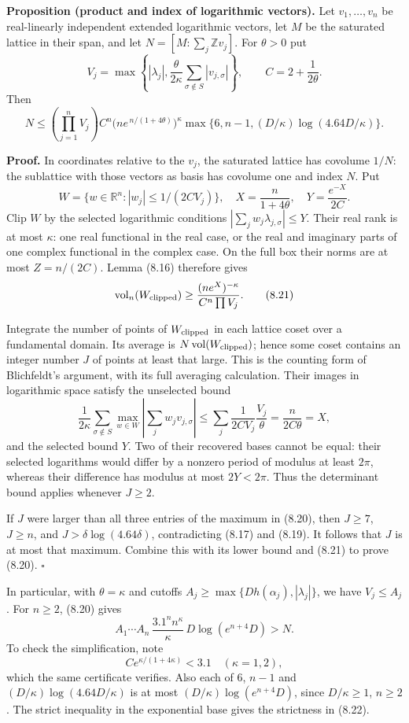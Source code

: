 \documentclass[
  11pt,
  a4paper,
]{article}
\begin{document}
\textbf{Proposition (product and index of logarithmic vectors).} Let
\(v_1,\ldots,v_n\) be real-linearly independent extended logarithmic
vectors, let \(M\) be the saturated lattice in their span, and let
\(N=[M:\sum_j\mathbb Z v_j]\). For \(\theta>0\) put \[
V_j=\max\left\{|\lambda_j|,
\frac{\theta}{2\kappa}\sum_{\sigma\notin S}|v_{j,\sigma}|\right\},\qquad
C=2+\frac1{2\theta}.
\] Then \[
N\le
\left(\prod_{j=1}^nV_j\right)
C^n\bigl(n e^{\,n/(1+4\theta)}\bigr)^\kappa
\max\{6,n-1,(D/\kappa)\log(4.64D/\kappa)\}.
\tag{8.20}
\]

\textbf{Proof.} In coordinates relative to the \(v_j\), the saturated
lattice has covolume \(1/N\): the sublattice with those vectors as basis
has covolume one and index \(N\). Put \[
W=\{w\in\mathbb R^n:|w_j|\le1/(2CV_j)\},\quad
X=\frac{n}{1+4\theta},\quad Y=\frac{e^{-X}}{2C}.
\] Clip \(W\) by the selected logarithmic conditions
\(|\sum_jw_j\lambda_{j,\sigma}|\le Y\). Their real rank is at most
\(\kappa\): one real functional in the real case, or the real and
imaginary parts of one complex functional in the complex case. On the
full box their norms are at most \(Z=n/(2C)\). Lemma (8.16) therefore
gives \[
\operatorname{vol}_n(W_{\rm clipped})
\ge\frac{(n e^X)^{-\kappa}}{C^n\prod V_j}.
\tag{8.21}
\]

Integrate the number of points of \(W_{\rm clipped}\) in each lattice
coset over a fundamental domain. Its average is
\(N\operatorname{vol}(W_{\rm clipped})\); hence some coset contains an
integer number \(J\) of points at least that large. This is the counting
form of Blichfeldt's argument, with its full averaging calculation.
Their images in logarithmic space satisfy the unselected bound \[
\frac1{2\kappa}\sum_{\sigma\notin S}
\max_{w\in W}\left|\sum_jw_jv_{j,\sigma}\right|
\le\sum_j\frac1{2CV_j}\frac{V_j}{\theta}
=\frac n{2C\theta}=X,
\] and the selected bound \(Y\). Two of their recovered bases cannot be
equal: their selected logarithms would differ by a nonzero period of
modulus at least \(2\pi\), whereas their difference has modulus at most
\(2Y<2\pi\). Thus the determinant bound applies whenever \(J\ge2\).

If \(J\) were larger than all three entries of the maximum in (8.20),
then \(J\ge7\), \(J\ge n\), and \(J>\delta\log(4.64\delta)\),
contradicting (8.17) and (8.19). It follows that \(J\) is at most that
maximum. Combine this with its lower bound and (8.21) to prove (8.20).
\(\square\)

In particular, with \(\theta=\kappa\) and cutoffs
\(A_j\ge\max\{D h(\alpha_j),|\lambda_j|\}\), we have \(V_j\le A_j\). For
\(n\ge2\), (8.20) gives \[
A_1\cdots A_n\,\frac{3.1^n n^\kappa}{\kappa}\,
D\log(e^{n+4}D)>N.
\tag{8.22}
\] To check the simplification, note \[
C e^{\kappa/(1+4\kappa)}<3.1
\quad(\kappa=1,2),
\] which the same certificate verifies. Also each of \(6\), \(n-1\) and
\((D/\kappa)\log(4.64D/\kappa)\) is at most
\((D/\kappa)\log(e^{n+4}D)\), since \(D/\kappa\ge1\), \(n\ge2\). The
strict inequality in the exponential base gives the strictness in
(8.22).
\end{document}
